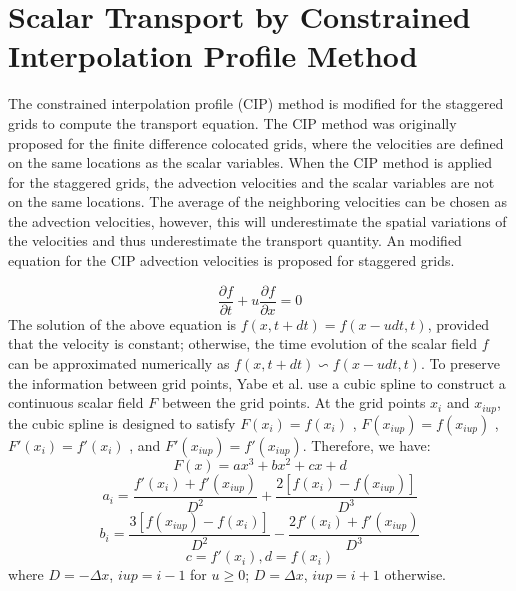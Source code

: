 \normalsize
\section{Scalar Transport by Constrained Interpolation Profile Method}

The constrained interpolation profile (CIP) method\cite{Yabe1991A, Yabe1991B, Yabe01} is modified for the staggered grids to compute the transport equation. The CIP method was originally proposed for the finite difference colocated grids, where the velocities are defined on the same locations as the scalar variables. When the CIP method is applied for the staggered grids, the advection velocities and the scalar variables are not on the same locations. The average of the neighboring velocities can be chosen as the advection velocities, however, this will underestimate the spatial variations of the velocities and thus underestimate the transport quantity. An modified equation for the CIP advection velocities is proposed for staggered grids.

\begin{equation}
\frac {\partial f}{\partial t} + u \frac {\partial f}{\partial
x}=0
\end{equation}
The solution of the above equation is $f(x,t+dt)=f(x-udt,t)$, provided
that the velocity is constant; otherwise, the time evolution of
the scalar field $f$ can be approximated numerically as $f(x,t+dt)
\backsim f(x-udt,t)$.
To preserve the information between grid points, Yabe et al.\cite{Yabe1991A, Yabe1991B, Yabe01} use a cubic spline to construct a continuous scalar field $F$ between the grid points. At the grid points $ x_i $ and $x_{iup}$, the cubic spline is designed to satisfy $F(x_i)=f(x_i)$ , $F(x_{i up})=f(x_{iup})$ ,
$F'(x_i)=f'(x_i)$ , and $F'(x_{iup})=f'(x_{iup})$. Therefore, we
have:
\begin{equation}
F(x)=ax^3+bx^2+cx+d
\end{equation}
\begin{equation}
a_i=\frac{f'(x_i)+f'(x_{iup})}{D^2}+\frac{2[f(x_i)-f(x_{iup})]}{D^3}
\end{equation}
\begin{equation}
b_i=\frac{3[f(x_{iup})-f(x_i)]}{D^2}-\frac{2f'(x_i)+f'(x_{iup})}{D^3}
\end{equation}
\begin{equation}
c=f'(x_i),  d=f(x_i)
\end{equation}
where $D=-\Delta x$, $iup=i-1$ for $u\geq 0$; $D=\Delta x$,
$iup=i+1$ otherwise.

